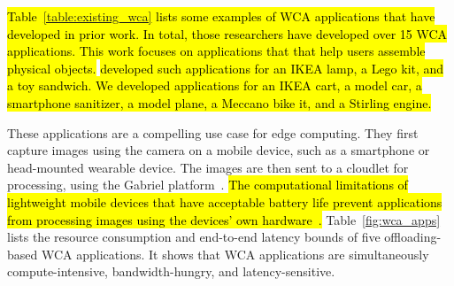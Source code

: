 \hl{
 Table~{\ref{table:existing_wca}} lists some examples of WCA applications that
have developed in prior work.
In total, those researchers have developed over 15 WCA applications.
This work focuses on applications that that help users assemble physical
objects.}
\citet{chen2017} \hl{developed such applications for an IKEA lamp, a Lego kit,
and a toy sandwich.
We developed applications for an IKEA cart, a model car, a smartphone sanitizer,
a model plane, a Meccano bike it, and a Stirling engine.
}

These applications are a compelling use case for edge computing.
They first capture images using the camera on a mobile device, such as a
smartphone or head-mounted wearable device.
The images are then sent to a cloudlet for processing, using the Gabriel
platform~\cite{ha2014}.
\hl{
The computational limitations of lightweight mobile devices that have acceptable
battery life prevent applications from processing images using the
devices' own hardware~{\cite{Satya2009}}.
}
Table~\ref{fig:wca_apps} lists the resource consumption and end-to-end latency
bounds of five offloading-based WCA applications.
It shows that WCA applications are simultaneously compute-intensive,
bandwidth-hungry, and latency-sensitive.

